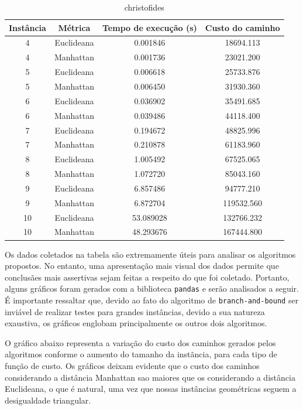 \documentclass{article}
\begin{document}
\begin{table}[H]
\centering
\caption{christofides}
\vspace{0.5cm}
\begin{tabular}{cccc}

Instância & Métrica & Tempo de execu{\c c}{\~a}o (s) & Custo do caminho \\

\hline                          
4 & Euclideana & 0.001846 & 18694.113 \\
4 & Manhattan & 0.001736 & 23021.200 \\
5 & Euclideana & 0.006618 & 25733.876 \\
5 & Manhattan & 0.006450 & 31930.360 \\
6 & Euclideana & 0.036902 & 35491.685 \\
6 & Manhattan & 0.039486 & 44118.400 \\
7 & Euclideana & 0.194672 & 48825.996 \\
7 & Manhattan & 0.210878 & 61183.960 \\
8 & Euclideana & 1.005492 & 67525.065 \\
8 & Manhattan & 1.072720 & 85043.160 \\
9 & Euclideana & 6.857486 & 94777.210 \\
9 & Manhattan & 6.872704 & 119532.560 \\
10 & Euclideana & 53.089028 & 132766.232 \\
10 & Manhattan & 48.293676 & 167444.800 \\

\end{tabular}
\end{table}

Os dados coletados na tabela são extremamente úteis para analisar os algoritmos propostos. No entanto, uma apresentação mais visual dos dados permite que conclusães mais assertivas sejam feitas a respeito do que foi coletado. Portanto, alguns gráficos foram gerados com a biblioteca \texttt{pandas} e serão analisados a seguir. É importante ressaltar que, devido ao fato do algoritmo de \texttt{branch-and-bound} ser inviável de realizar testes para grandes instâncias, devido a sua natureza exaustiva, os gráficos englobam principalmente os outros dois algoritmos.

O gráfico abaixo representa a variação do custo dos caminhos gerados pelos algoritmos conforme o aumento do tamanho da instãncia, para cada tipo de função de custo. Os gráficos deixam evidente que o custo dos caminhos considerando a distância Manhattan sao maiores que os considerando a distância Euclideana, o que é natural, uma vez que nossas instâncias geométricas seguem a desigualdade triangular.
\end{document}
